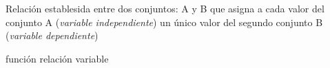 
\question Relación establesida entre dos conjuntos: A y B que asigna a cada
          valor del conjunto A (\emph{variable independiente}) un único
          valor del segundo conjunto B (\emph{variable dependiente})

  \begin{oneparchoices}
    \CorrectChoice función
    \choice relación
    \choice variable
  \end{oneparchoices}
